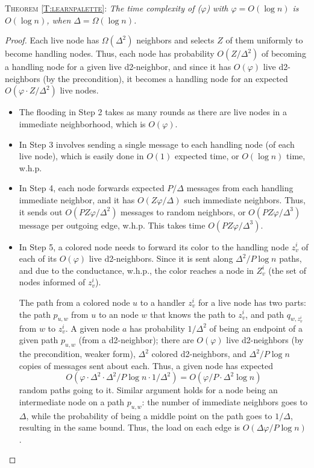 \textsc{Theorem \ref{T:learnpalette}:} 
\emph{The time complexity of ($\varphi$) with $\varphi=O(\log n)$ is $O(\log n)$, when $\Delta = \Omega(\log n)$.}
%
\begin{proof}
Each live node has $\Omega(\Delta^2)$ neighbors and selects $Z$ of them uniformly to become handling nodes. Thus, each node has probability $O(Z/\Delta^2)$ of becoming a handling node for a given live d2-neighbor, and since it has $O(\varphi)$ live d2-neighbors (by the precondition), it becomes a handling node for an expected $O(\varphi \cdot Z/\Delta^2)$ live nodes. 
\begin{itemize}
\item The flooding in Step 2 takes as many rounds as there are live nodes in a immediate neighborhood, which is $O(\varphi)$.
\item In Step 3 involves sending a single message to each handling node (of each live node), which is easily done in $O(1)$ expected time, or $O(\log n)$ time, w.h.p.
\item In Step 4, each node forwards expected $P/\Delta$ messages from each handling immediate neighbor, and it has $O(Z\varphi/\Delta)$ such immediate neighbors. 
Thus, it sends out $O(P Z\varphi/\Delta^2)$ messages to random neighbors, or $O(P Z \varphi/\Delta^3)$ message per outgoing edge, w.h.p. This takes time $O(PZ \varphi/\Delta^3)$. 
\item In Step 5, a colored node needs to forward its color to the handling node $z_v^i$ of each of its $O(\varphi)$ live d2-neighbors. Since it is sent along $\Delta^2/P \log n$ paths, and due to the conductance,  w.h.p., the color reaches a node in $Z_v^i$ (the set of nodes informed of $z_v^i$). 

The path from a colored node $u$ to a handler $z_v^i$ for a live node has two parts: the path $p_{u,w}$ from $u$ to an node $w$ that knows the path to $z_v^i$, and path $q_{w,z_v^i}$ from $w$ to $z_v^i$. 
A given node $a$ has probability $1/\Delta^2$ of being an endpoint of a given path $p_{u,w}$ (from a d2-neighbor); there are $O(\varphi)$ live d2-neighbors (by the precondition, weaker form), $\Delta^2$ colored d2-neighbors, and $\Delta^2/P \log n$ copies of messages sent about each. Thus, a given node has expected 
\[ O(\varphi \cdot \Delta^2 \cdot \Delta^2/P \log n \cdot 1/\Delta^2) = O(\varphi/P \cdot \Delta^2 \log n) \] 
random paths going to it.
Similar argument holds for a node being an intermediate node on a path $p_{u,w}$: the number of immediate neighbors goes to $\Delta$, while the probability of being a middle point on the path goes to $1/\Delta$, resulting in the same bound.
Thus, the load on each edge is $O(\Delta \varphi/P \log n)$. 


\end{itemize}
\end{proof}

